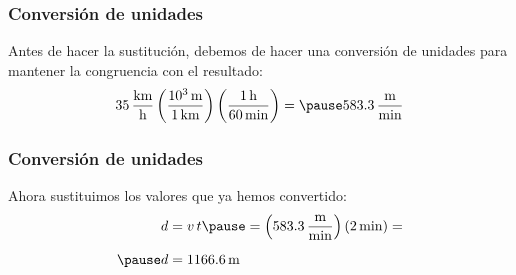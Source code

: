 \documentclass[14pt]{beamer}
\begin{document}
\begin{frame}
\frametitle{Conversión de unidades}
Antes de hacer la sustitución, debemos de hacer una conversión de unidades para mantener la congruencia con el resultado:
\pause
\begin{eqnarray*}
\begin{aligned}
\SI[per-mode=fraction]{35}{\kilo\meter\per\hour} \left( \dfrac{\SI{d3}{\meter}}{\SI{1}{\kilo\meter}} \right) \left( \dfrac{\SI{1}{\hour}}{\SI{60}{\minute}} \right) = \pause \SI[per-mode=fraction]{583.3}{\meter\per\minute}
\end{aligned}
\end{eqnarray*}
\end{frame}
\begin{frame}
\frametitle{Conversión de unidades}
Ahora sustituimos los valores que ya hemos convertido:
\pause
\begin{eqnarray*}
\begin{aligned}
d &= v \, t \pause = \left( \SI[per-mode=fraction]{583.3}{\meter\per\minute} \right) \left( \SI{2}{\minute} \right) = \\[0.5em] \pause
d &= \SI{1166.6}{\meter}
\end{aligned}
\end{eqnarray*}
\end{frame}
\end{document}

